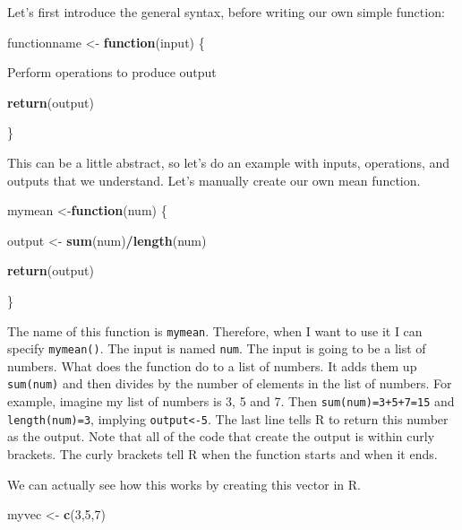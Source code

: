 \documentclass[
]{book}
\newenvironment{Shaded}{\begin{snugshade}}{\end{snugshade}}
\newcommand{\ControlFlowTok}[1]{\textcolor[rgb]{0.13,0.29,0.53}{\textbf{#1}}}
\newcommand{\DecValTok}[1]{\textcolor[rgb]{0.00,0.00,0.81}{#1}}
\newcommand{\FunctionTok}[1]{\textcolor[rgb]{0.13,0.29,0.53}{\textbf{#1}}}
\newcommand{\NormalTok}[1]{#1}
\newcommand{\OtherTok}[1]{\textcolor[rgb]{0.56,0.35,0.01}{#1}}
\newcommand{\SpecialCharTok}[1]{\textcolor[rgb]{0.81,0.36,0.00}{\textbf{#1}}}
\begin{document}
Let's first introduce the general syntax, before writing our own simple function:

\begin{Shaded}
\begin{Highlighting}[]
\NormalTok{functionname }\OtherTok{\textless{}{-}} \ControlFlowTok{function}\NormalTok{(input) \{}
  
\NormalTok{  Perform operations to produce output }
  
  \FunctionTok{return}\NormalTok{(output)}
  
\NormalTok{\}}
\end{Highlighting}
\end{Shaded}

This can be a little abstract, so let's do an example with inputs, operations, and outputs that we understand. Let's manually create our own mean function.

\begin{Shaded}
\begin{Highlighting}[]
\NormalTok{mymean }\OtherTok{\textless{}{-}}\ControlFlowTok{function}\NormalTok{(num) \{}
  
\NormalTok{  output }\OtherTok{\textless{}{-}} \FunctionTok{sum}\NormalTok{(num)}\SpecialCharTok{/}\FunctionTok{length}\NormalTok{(num)}
  
  \FunctionTok{return}\NormalTok{(output)}
  
\NormalTok{\}}
\end{Highlighting}
\end{Shaded}

The name of this function is \texttt{mymean}. Therefore, when I want to use it I can specify \texttt{mymean()}. The input is named \texttt{num}. The input is going to be a list of numbers. What does the function do to a list of numbers. It adds them up \texttt{sum(num)} and then divides by the number of elements in the list of numbers. For example, imagine my list of numbers is 3, 5 and 7. Then \texttt{sum(num)=3+5+7=15} and \texttt{length(num)=3}, implying \texttt{output\textless{}-5}. The last line tells R to return this number as the output. Note that all of the code that create the output is within curly brackets. The curly brackets tell R when the function starts and when it ends.

We can actually see how this works by creating this vector in R.

\begin{Shaded}
\begin{Highlighting}[]
\NormalTok{myvec }\OtherTok{\textless{}{-}} \FunctionTok{c}\NormalTok{(}\DecValTok{3}\NormalTok{,}\DecValTok{5}\NormalTok{,}\DecValTok{7}\NormalTok{)}
\end{Highlighting}
\end{Shaded}
\end{document}
